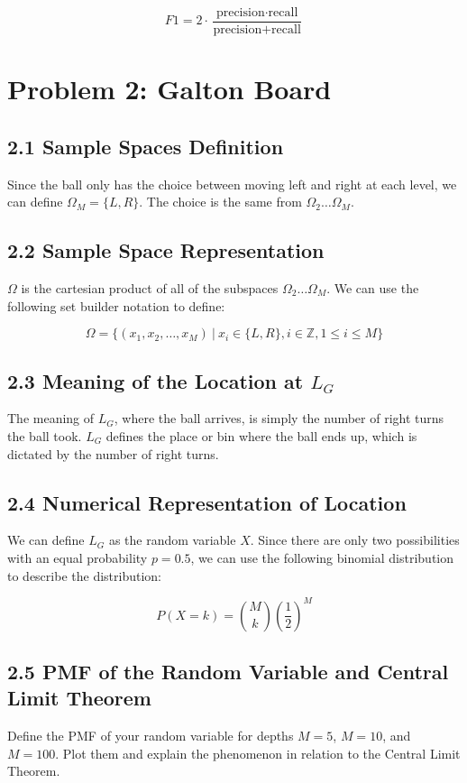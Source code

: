 \documentclass{article}
\begin{document}
\[
F1 = 2 \cdot \frac{\text{precision} \cdot \text{recall}}{\text{precision} + \text{recall}}
\]

\section*{Problem 2: Galton Board}

\subsection*{2.1 Sample Spaces Definition}
Since the ball only has the choice between moving left and right at each level,
we can define $\Omega_M = \{L, R\}$. The choice is the same from $\Omega_2 \dots \Omega_M$.

\subsection*{2.2 Sample Space Representation}
$\Omega$ is the cartesian product of all of the subspaces $\Omega_2 \dots \Omega_M$. We can use the
following set builder notation to define:

\[
\Omega = \{(x_1, x_2, \dots, x_M) \ | \ x_i \in \{L, R\}, i \in \mathbb{Z}, 1 \le i \le M\}
\]

\subsection*{2.3 Meaning of the Location at $L_G$}
The meaning of $L_G$, where the ball arrives, is simply the number of right turns
the ball took. $L_G$ defines the place or bin where the ball ends up, which is
dictated by the number of right turns.

\subsection*{2.4 Numerical Representation of Location}
We can define $L_G$ as the random variable $X$. Since there are only two possibilities
with an equal probability $p = 0.5$, we can use the following binomial distribution
to describe the distribution:

\[
P(X = k) = \binom{M}{k}\left(\frac{1}{2}\right)^M
\]

\subsection*{2.5 PMF of the Random Variable and Central Limit Theorem}
Define the PMF of your random variable for depths $M = 5$, $M = 10$, and
$M = 100$. Plot them and explain the phenomenon in relation to the Central
Limit Theorem.
\end{document}
